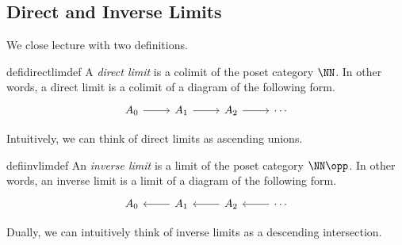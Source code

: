 \subsection{Direct and Inverse Limits}
We close lecture with two definitions.
\begin{restatable}{defi}{directlimdef} %
	A \textit{direct limit} is a colimit of the poset category $\NN$. In other words, a direct limit is a colimit of a diagram of the following form.
	\[\begin{tikzcd}[ampersand replacement=\&]
		{A_0} \& {A_1} \& {A_2} \& \cdots
		\arrow[from=1-1, to=1-2]
		\arrow[from=1-2, to=1-3]
		\arrow[from=1-3, to=1-4]
	\end{tikzcd}\]
\end{restatable}
\noindent Intuitively, we can think of direct limits as ascending unions.
\begin{restatable}{defi}{invlimdef} %
	An \textit{inverse limit} is a limit of the poset category $\NN\opp$. In other words, an inverse limit is a limit of a diagram of the following form.
	\[\begin{tikzcd}[ampersand replacement=\&]
		{A_0} \& {A_1} \& {A_2} \& \cdots
		\arrow[from=1-2, to=1-1]
		\arrow[from=1-3, to=1-2]
		\arrow[from=1-4, to=1-3]
	\end{tikzcd}\]
\end{restatable}
\noindent Dually, we can intuitively think of inverse limits as a descending intersection.